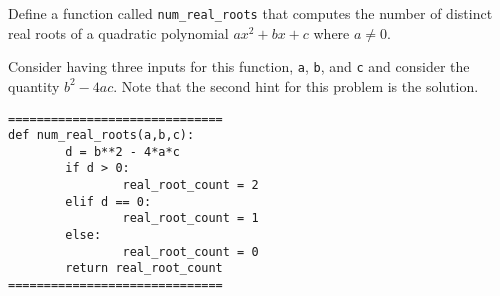 \documentclass{ximera}
\begin{document}
\begin{question}
	Define a function called \verb|num_real_roots| that computes the number of distinct real roots of a quadratic polynomial $ax^2+bx+c$ where $a\neq 0$.
	\begin{hint}
	Consider having three inputs for this function, \verb|a|, \verb|b|, and \verb|c| and consider the quantity $b^2-4ac$. Note that the second hint for this problem is the solution.
	\end{hint}
	\begin{hint}
\begin{verbatim}
==============================
def num_real_roots(a,b,c):
        d = b**2 - 4*a*c
        if d > 0:
                real_root_count = 2
        elif d == 0:
                real_root_count = 1
        else:
                real_root_count = 0
        return real_root_count
==============================
\end{verbatim}
	\end{hint}
\end{question}
\end{document}
